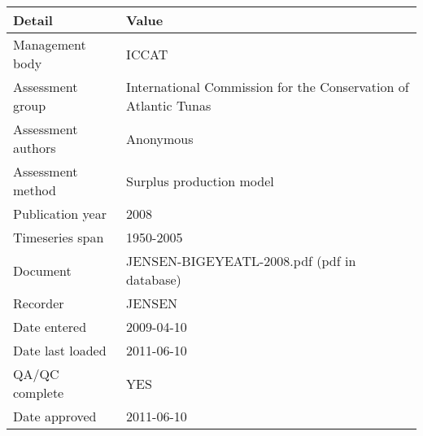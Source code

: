 \begin{table}[htb]
\centering
\begin{tabular}{lp{7cm}}
\toprule
Detail & Value \\
\midrule
Management body    & ICCAT                                                           \\
Assessment group   & International Commission for the Conservation of Atlantic Tunas \\
Assessment authors & Anonymous                                                       \\
Assessment method  & Surplus production model                                        \\
Publication year   & 2008                                                            \\
Timeseries span    & 1950-2005                                                       \\
Document           & JENSEN-BIGEYEATL-2008.pdf (pdf in database)                     \\
Recorder           & JENSEN                                                          \\
Date entered       & 2009-04-10                                                      \\
Date last loaded   & 2011-06-10                                                      \\
QA/QC complete     & YES                                                             \\
Date approved      & 2011-06-10                                                      \\
\bottomrule
\end{tabular}
\label{tab:assessdet}
\end{table}
